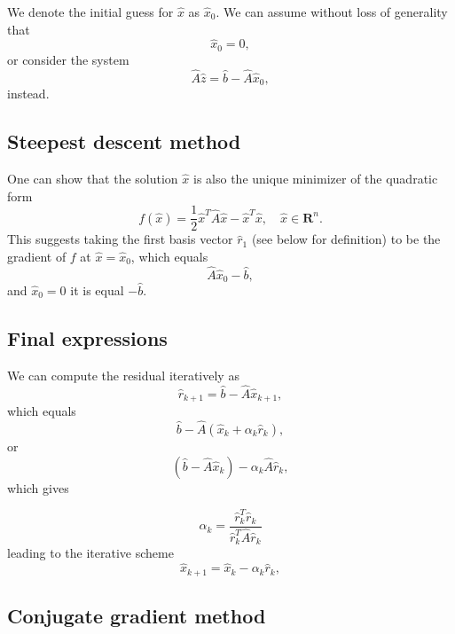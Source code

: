 \documentclass[%
oneside,                 %
final,                   %
10pt]{article}
\begin{document}
We denote the initial guess for $\hat{x}$ as $\hat{x}_0$. 
We can assume without loss of generality that
\begin{equation*}
\hat{x}_0=0,
\end{equation*}
or consider the system
\begin{equation*}
\hat{A}\hat{z} = \hat{b}-\hat{A}\hat{x}_0,
\end{equation*}
instead.

\subsection*{Steepest descent  method}

One can show that the solution $\hat{x}$ is also the unique minimizer of the quadratic form
\begin{equation*}
  f(\hat{x}) = \frac{1}{2}\hat{x}^T\hat{A}\hat{x} - \hat{x}^T \hat{x} , \quad \hat{x}\in\mathbf{R}^n. 
\end{equation*}
This suggests taking the first basis vector $\hat{r}_1$ (see below for definition) 
to be the gradient of $f$ at $\hat{x}=\hat{x}_0$, 
which equals
\begin{equation*}
\hat{A}\hat{x}_0-\hat{b},
\end{equation*}
and 
$\hat{x}_0=0$ it is equal $-\hat{b}$.

\subsection*{Final expressions}

We can compute the residual iteratively as
\begin{equation*}
\hat{r}_{k+1}=\hat{b}-\hat{A}\hat{x}_{k+1},
 \end{equation*}
which equals
\begin{equation*}
\hat{b}-\hat{A}(\hat{x}_k+\alpha_k\hat{r}_k),
 \end{equation*}
or
\begin{equation*}
(\hat{b}-\hat{A}\hat{x}_k)-\alpha_k\hat{A}\hat{r}_k,
 \end{equation*}
which gives

\[
\alpha_k = \frac{\hat{r}_k^T\hat{r}_k}{\hat{r}_k^T\hat{A}\hat{r}_k}
\]
leading to the iterative scheme
\begin{equation*}
\hat{x}_{k+1}=\hat{x}_k-\alpha_k\hat{r}_{k},
 \end{equation*}

\subsection*{Conjugate gradient method}
\end{document}
